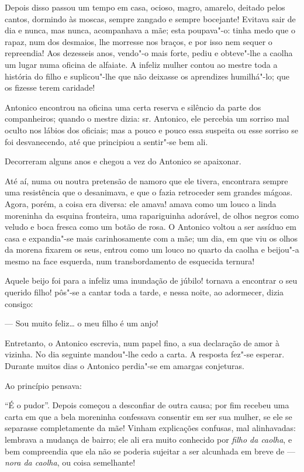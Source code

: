 Depois disso passou um tempo em casa, ocioso, magro, amarelo, deitado
pelos cantos, dormindo às moscas, sempre zangado e sempre bocejante!
Evitava sair de dia e nunca, mas nunca, acompanhava a mãe; esta
poupava"-o: tinha medo que o rapaz, num dos desmaios, lhe morresse nos
braços, e por isso nem sequer o repreendia! Aos dezesseis anos, vendo"-o
mais forte, pediu e obteve"-lhe a caolha um lugar numa oficina de
alfaiate. A infeliz mulher contou ao mestre toda a história do filho e
suplicou"-lhe que não deixasse os aprendizes humilhá"-lo; que os fizesse
terem caridade!

Antonico encontrou na oficina uma certa reserva e silêncio da parte dos
companheiros; quando o mestre dizia: sr. Antonico, ele percebia um
sorriso mal oculto nos lábios dos oficiais; mas a pouco e pouco essa
suspeita ou esse sorriso se foi desvanecendo, até que principiou a
sentir"-se bem ali.

Decorreram alguns anos e chegou a vez do Antonico se apaixonar.

Até aí, numa ou noutra pretensão de namoro que ele tivera, encontrara
sempre uma resistência que o desanimava, e que o fazia retroceder sem
grandes mágoas. Agora, porém, a coisa era diversa: ele amava! amava como
um louco a linda moreninha da esquina fronteira, uma rapariguinha
adorável, de olhos negros como veludo e boca fresca como um botão de
rosa. O Antonico voltou a ser assíduo em casa e expandia"-se mais
carinhosamente com a mãe; um dia, em que viu os olhos da morena fixarem
os seus, entrou como um louco no quarto da caolha e beijou"-a mesmo na
face esquerda, num transbordamento de esquecida ternura!

Aquele beijo foi para a infeliz uma inundação de júbilo! tornava a
encontrar o seu querido filho! pôs"-se a cantar toda a tarde, e nessa
noite, ao adormecer, dizia consigo:

--- Sou muito feliz\ldots{} o meu filho é um anjo!

Entretanto, o Antonico escrevia, num papel fino, a sua declaração de
amor à vizinha. No dia seguinte mandou"-lhe cedo a carta. A resposta
fez"-se esperar. Durante muitos dias o Antonico perdia"-se em amargas
conjeturas.

Ao princípio pensava:

``É o pudor''. Depois começou a desconfiar de outra causa; por fim
recebeu uma carta em que a bela moreninha confessava consentir em ser
sua mulher, se ele se separasse completamente da mãe! Vinham explicações
confusas, mal alinhavadas: lembrava a mudança de bairro; ele ali era
muito conhecido por \emph{filho da caolha}, e bem compreendia que ela
não se poderia sujeitar a ser alcunhada em breve de --- \emph{nora da
caolha}, ou coisa semelhante!

